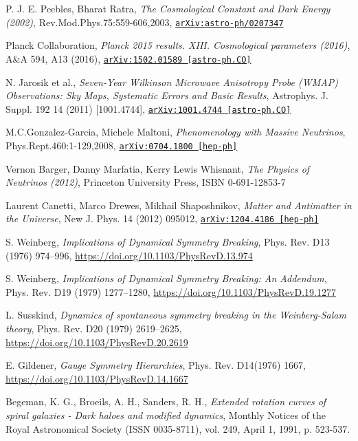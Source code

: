 \documentclass[12pt,a4paper,openright,twoside]{report}
\newcommand{\bibref}[4]{#1, \textit{#2}, #3 #4}
\begin{document}
\begin{thebibliography}{9}
	\bibref{P. J. E. Peebles, Bharat Ratra}{The Cosmological Constant and Dark Energy (2002)}{Rev.Mod.Phys.75:559-606,2003,}{\href{https://arxiv.org/abs/astro-ph/0207347}{\texttt{arXiv:astro-ph/0207347}}}

	\bibref{Planck Collaboration}{Planck 2015 results. XIII. Cosmological parameters (2016)}{A\&A 594, A13 (2016),}{\href{https://arxiv.org/abs/1502.01589}{\texttt{arXiv:1502.01589 [astro-ph.CO]}}}

	\bibref{N. Jarosik et al.}{Seven-Year Wilkinson Microwave Anisotropy Probe (WMAP) Observations: Sky Maps, Systematic Errors and Basic Results}{Astrophys. J. Suppl. 192 14 (2011) [1001.4744],}{\href{https://arxiv.org/abs/1001.4744}{\texttt{arXiv:1001.4744 [astro-ph.CO]}}}

	\bibref{M.C.Gonzalez-Garcia, Michele Maltoni}{Phenomenology with Massive Neutrinos}{Phys.Rept.460:1-129,2008,}{\href{https://arxiv.org/abs/0704.1800}{\texttt{arXiv:0704.1800 [hep-ph]}}}

	\bibref{Vernon Barger, Danny Marfatia, Kerry Lewis Whisnant}{The Physics of Neutrinos (2012)}{Princeton University Press,}{ISBN 0-691-12853-7}

	\bibref{Laurent Canetti, Marco Drewes, Mikhail Shaposhnikov}{Matter and Antimatter in the Universe}{New J. Phys. 14 (2012) 095012,}{\href{https://arxiv.org/abs/1204.4186}{\texttt{arXiv:1204.4186 [hep-ph]}}}

	\bibref{S. Weinberg}{Implications of Dynamical Symmetry Breaking}{Phys. Rev. D13 (1976) 974–996,}{\url{https://doi.org/10.1103/PhysRevD.13.974}}

	\bibref{S. Weinberg}{Implications of Dynamical Symmetry Breaking:  An Addendum}{Phys. Rev. D19 (1979) 1277–1280,}{\url{https://doi.org/10.1103/PhysRevD.19.1277}}

	\bibref{L. Susskind}{Dynamics of spontaneous symmetry breaking in the Weinberg-Salam theory}{Phys. Rev. D20 (1979) 2619–2625,}{\url{https://doi.org/10.1103/PhysRevD.20.2619}}

	\bibref{E. Gildener}{Gauge Symmetry Hierarchies}{Phys. Rev. D14(1976) 1667,}{\url{https://doi.org/10.1103/PhysRevD.14.1667}}

	\bibref{Begeman, K. G., Broeils, A. H., Sanders, R. H.}{Extended rotation curves of spiral galaxies - Dark haloes and modified dynamics}{Monthly Notices of the Royal Astronomical Society (ISSN 0035-8711), vol. 249, April 1, 1991, p. 523-537.}
	

\end{thebibliography}
\end{document}
